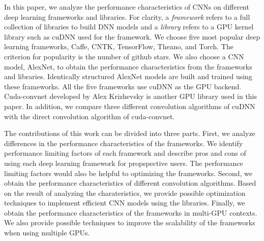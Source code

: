 In this paper, we analyze the performance characteristics of CNNs on different deep learning frameworks and libraries.
For clarity, a \textit{framework} refers to a full collection of libraries to build DNN models and a \textit{library} refers to a GPU kernel library such as cuDNN used for the framework.
We choose five most popular deep learning frameworks, Caffe\cite{jia2014caffe}, CNTK\cite{cntk}, TensorFlow\cite{tensorflow2015-whitepaper}, Theano\cite{DBLP:journals/corr/Al-RfouAAa16}, and Torch\cite{torch}.
The criterion for popularity is the number of github\cite{github} stars.
We also choose a CNN model, AlexNet\cite{krizhevsky2012imagenet}, to obtain the performance characteristics from the frameworks and libraries.
Identically structured AlexNet models are built and trained using these frameworks.
All the five frameworks use cuDNN as the GPU backend.
Cuda-convnet\cite{cuda-convnet} developed by Alex Krizhevsky is another GPU library used in this paper.
In addition, we compare three different convolution algorithms of cuDNN with the direct convolution algorithm of cuda-convnet.

The contributions of this work can be divided into three parts.
First, we analyze differences in the performance characteristics of the frameworks.
We identify performance limiting factors of each framework and describe pros and cons of using each deep learning framework for propspective users.
The performance limiting factors would also be helpful to optimizing the frameworks.
Second, we obtain the performance characteristics of different convolution algorithms.
Based on the result of analyzing the charateristics, we provide possible optimization techniques to implement efficient CNN models using the libraries.
Finally, we obtain the performance characteristics of the frameworks in multi-GPU contexts. We also provide possible techniques to improve the scalability of the frameworks when using multiple GPUs.
